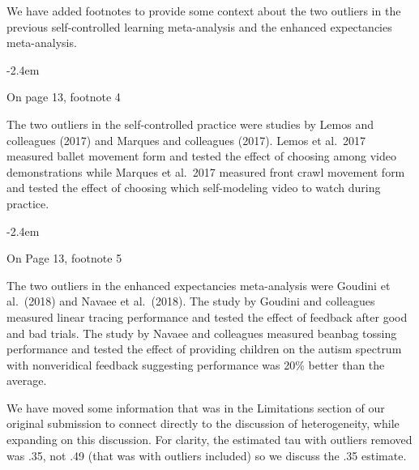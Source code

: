 \documentclass[final]{article}
\renewenvironment{quote}{\begin{fquote}\advance\leftmargini -2.4em\begin{oldquote}}{\end{oldquote}\end{fquote}}
\newenvironment{fquote}
  {\def\FrameCommand{
	\fboxsep=0.6em %
	\fcolorbox{black}{white}}%
    \MakeFramed {\advance\hsize-2\width \FrameRestore}
    \begin{minipage}{\linewidth}
  }
  {\end{minipage}\endMakeFramed}
\begin{document}

We have added footnotes to provide some context about the two outliers in the previous self-controlled learning meta-analysis and the enhanced expectancies meta-analysis.

\begin{quote}
On page 13, footnote 4

The two outliers in the self-controlled practice were studies by Lemos and colleagues (2017) and Marques and colleagues (2017). Lemos et al.~2017 measured ballet movement form and tested the effect of choosing among video demonstrations while Marques et al.~2017 measured front crawl movement form and tested the effect of choosing which self-modeling video to watch during practice.
\end{quote}

\begin{quote}
On Page 13, footnote 5

The two outliers in the enhanced expectancies meta-analysis were Goudini et al.~(2018) and Navaee et al.~(2018). The study by Goudini and colleagues measured linear tracing performance and tested the effect of feedback after good and bad trials. The study by Navaee and colleagues measured beanbag tossing performance and tested the effect of providing children on the autism spectrum with nonveridical feedback suggesting performance was 20\% better than the average.
\end{quote}


We have moved some information that was in the Limitations section of our original submission to connect directly to the discussion of heterogeneity, while expanding on this discussion. For clarity, the estimated tau with outliers removed was .35, not .49 (that was with outliers included) so we discuss the .35 estimate.
\end{document}
